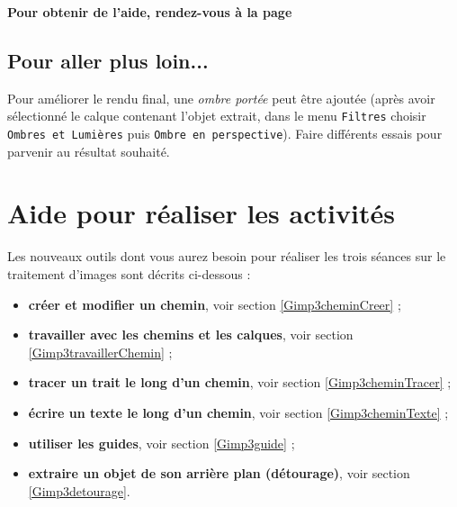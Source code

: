 \textbf{Pour obtenir de l'aide, rendez-vous à la page \pageref{Image4eOutils}}



\subsection{Pour aller plus loin...}

Pour améliorer le rendu final, une \emph{ombre portée} peut être ajoutée (après avoir sélectionné le calque contenant l'objet extrait, dans le menu \texttt{Filtres} choisir \texttt{Ombres et Lumières} puis \texttt{Ombre en perspective}). Faire différents essais pour parvenir au résultat souhaité.




\vfill







\newpage

\section{Aide pour réaliser les activités}\label{Image4eOutils}
 
Les nouveaux outils dont vous aurez besoin pour réaliser les trois séances sur le traitement d'images sont décrits ci-dessous :

\begin{itemize}
\item \textbf{créer et modifier un chemin}, voir section \vref{Gimp3cheminCreer} ;
\item \textbf{travailler avec les chemins et les calques}, voir section \vref{Gimp3travaillerChemin} ; 
\item \textbf{tracer un trait le long d'un chemin}, voir section \vref{Gimp3cheminTracer} ;
\item \textbf{écrire un texte le long d'un chemin}, voir section \vref{Gimp3cheminTexte} ;
\item \textbf{utiliser les guides}, voir section \vref{Gimp3guide} ;
\item \textbf{extraire un objet de son arrière plan (détourage)}, voir section \vref{Gimp3detourage}.
\end{itemize}  


